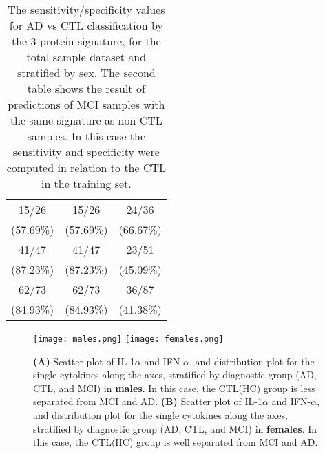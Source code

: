 \documentclass{standalone}
\begin{document}
\begin{table}[!htb]
\begin{minipage}{.5\linewidth}
\begin{tabular}{ccc}
          \hline
                           15/26            &   15/26                &   24/36               \\
                                 (57.69\%)  &         (57.69\%)      &         (66.67\%)     \\
                           41/47            &   41/47                &   23/51               \\
                                 (87.23\%)  &         (87.23\%)      &         (45.09\%)     \\
                           62/73            &   62/73                &   36/87               \\
                                 (84.93\%)  &         (84.93\%)      &         (41.38\%)     \\
          \hline
      \end{tabular}
  \end{minipage}
  \caption{The sensitivity/specificity values for AD vs CTL classification by the 3-protein signature, for the total sample dataset and stratified by sex.
    The second table shows the result of predictions of MCI samples with the same signature as non-CTL samples.
    In this case the sensitivity and specificity were computed in relation to the CTL in the training set.
  }
  \label{tab:cytokine}
\end{table}


\begin{figure}[htbp]
\hspace{-1.0cm}
\texttt{[image: males.png]}
\qquad\qquad
\hspace{1.0cm}
\texttt{[image: females.png]}
\caption{\textbf{(A)} Scatter plot of IL-1$\alpha$ and IFN-$\alpha$, and distribution plot for the single cytokines along the axes, stratified by diagnostic group (AD, CTL, and MCI) in \textbf{males}.
In this case, the CTL(HC) group is less separated from MCI and AD.
\textbf{(B)} Scatter plot of IL-1$\alpha$ and IFN-$\alpha$, and distribution plot for the single cytokines along the axes, stratified by diagnostic group (AD, CTL, and MCI) in \textbf{females}.
In this case, the CTL(HC) group is well separated from MCI and AD.
}
\label{fig:cytokine_sex}
\end{figure}
\end{document}
